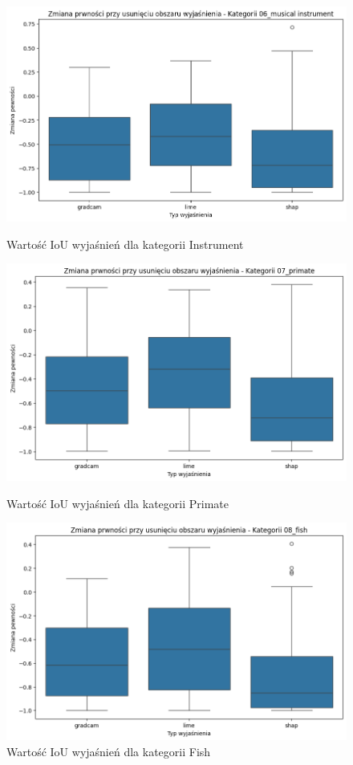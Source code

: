 \begin{figure}
	\centering
	\begin{minipage}[b]{0.3\textwidth}
		\centering\includegraphics[width=.9\textwidth]{img/base_confidence_mask_music}
		\caption{Wartość IoU wyjaśnień dla kategorii Instrument}  \label{rys:base_confidence_mask_music}
	\end{minipage}
	\begin{minipage}[b]{0.3\textwidth}
		\centering\includegraphics[width=.9\textwidth]{img/base_confidence_mask_primate}
		\caption{Wartość IoU wyjaśnień dla kategorii Primate}  \label{rys:base_confidence_mask_primate}
	\end{minipage}
	\begin{minipage}[b]{0.3\textwidth}
		\centering\includegraphics[width=.9\textwidth]{img/base_confidence_mask_fish}
		\caption{Wartość IoU wyjaśnień dla kategorii Fish}  \label{rys:base_confidence_mask_fish}
	\end{minipage}
\end{figure}
